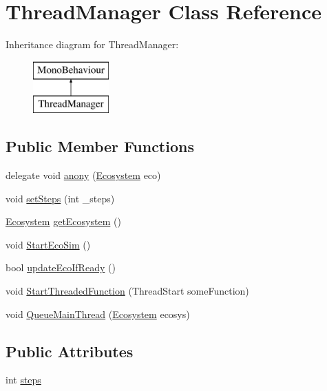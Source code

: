 \hypertarget{class_thread_manager}{}\section{Thread\+Manager Class Reference}
\label{class_thread_manager}
Inheritance diagram for Thread\+Manager\+:\begin{figure}[H]
\begin{center}
\leavevmode
\includegraphics[height=2.000000cm]{class_thread_manager}
\end{center}
\end{figure}
\subsection*{Public Member Functions}
\begin{DoxyCompactItemize}
\item 
delegate void \mbox{\hyperlink{class_thread_manager_a31b09b282d070ea1e0d6ca52af4a64b6}{anony}} (\mbox{\hyperlink{class_ecosystem}{Ecosystem}} eco)
\item 
void \mbox{\hyperlink{class_thread_manager_a1d2756b24756d187ebf25779d623e980}{set\+Steps}} (int \+\_\+steps)
\item 
\mbox{\hyperlink{class_ecosystem}{Ecosystem}} \mbox{\hyperlink{class_thread_manager_ad8339ead9d54c051097f3b5ba3b963f3}{get\+Ecosystem}} ()
\item 
void \mbox{\hyperlink{class_thread_manager_a4dbbef51cfc289eb181c49febf97ce63}{Start\+Eco\+Sim}} ()
\item 
bool \mbox{\hyperlink{class_thread_manager_ae8fcc8db16fab19e95bf9d8dbe8be03a}{update\+Eco\+If\+Ready}} ()
\item 
void \mbox{\hyperlink{class_thread_manager_acd855802214dc3bd50bdda044fcb76ec}{Start\+Threaded\+Function}} (Thread\+Start some\+Function)
\item 
void \mbox{\hyperlink{class_thread_manager_a1924e893092403b573090341efa87380}{Queue\+Main\+Thread}} (\mbox{\hyperlink{class_ecosystem}{Ecosystem}} ecosys)
\end{DoxyCompactItemize}
\subsection*{Public Attributes}
\begin{DoxyCompactItemize}
\item 
int \mbox{\hyperlink{class_thread_manager_a2a86413c99cfa790288f86dec82ea06a}{steps}}
\end{DoxyCompactItemize}



